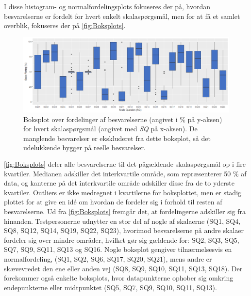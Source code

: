 \noindent
%
I disse histogram- og normalfordelingsplots fokuseres der på, hvordan besvarelserne er fordelt for hvert enkelt skalaspørgsmål, men for at få et samlet overblik, fokuseres der på \autoref{fig:Boksplots}. 
%
\begin{figure}[H]
\centering
\includegraphics[width = \textwidth]{Figure/DatabehandlingSkalaer/BoksplotUden0er} 
\caption{Boksplot over fordelinger af besvarelserne (angivet i \% på y-aksen) for hvert skalaspørgsmål (angivet med \textit{SQ} på x-aksen). De manglende besvarelser er ekskluderet fra dette boksplot, så det udelukkende bygger på reelle besvarelser.}
\label{fig:Boksplots}
\end{figure}
\noindent
%
\autoref{fig:Boksplots} deler alle besvarelserne til det pågældende skalaspørgsmål op i fire kvartiler. Medianen adskiller det interkvartile område, som repræsenterer 50 \% af data, og kanterne på det interkvartile område adskiller disse fra de to yderste kvartiler. Outliers er ikke medregnet i kvartilerne for boksplottet, men er stadig plottet for at give en idé om hvordan de fordeler sig i forhold til resten af besvarelserne. \blankline
%
Ud fra \autoref{fig:Boksplots} fremgår det, at fordelingerne adskiller sig fra hinanden. Testpersonerne udnytter en stor del af nogle af skalaerne (SQ1, SQ4, SQ8, SQ12, SQ14, SQ19, SQ22, SQ23), hvorimod besvarelserne på andre skalaer fordeler sig over mindre områder, hvilket gør sig gældende for: SQ2, SQ3, SQ5, SQ7, SQ9, SQ11, SQ13 og SQ16. Nogle boksplot gengiver tilnærmelsesvis en normalfordeling, (SQ1, SQ2, SQ6, SQ17, SQ20, SQ21), mens andre er skævevredet den ene eller anden vej (SQ8, SQ9, SQ10, SQ11, SQ13, SQ18). Der forekommer også enkelte boksplots, hvor datapunkterne ophober sig omkring endepunkterne eller midtpunktet (SQ5, SQ7, SQ9, SQ10, SQ11, SQ13). \blankline
%

